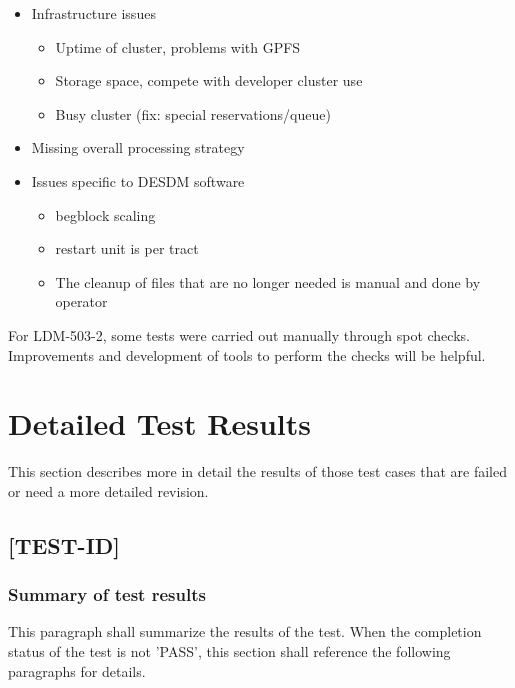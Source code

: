 \documentclass[DM,lsstdraft,STR,toc]{lsstdoc}
\begin{document}
\begin{itemize}
\begin{itemize}
  \end{itemize}
  \item Infrastructure issues
  \begin{itemize}
    \item Uptime of cluster, problems with GPFS
    \item Storage space, compete with developer cluster use
    \item Busy cluster (fix: special reservations/queue)
  \end{itemize}
  \item Missing overall processing strategy
  \item Issues specific to DESDM software
  \begin{itemize}
    \item begblock scaling
    \item restart unit is per tract
    \item The cleanup of files that are no longer needed is manual and done by operator
  \end{itemize}
\end{itemize}

For LDM-503-2, some tests were carried out manually through spot checks.
Improvements and development of tools to perform the checks will be helpful.


\newpage

\section{Detailed Test Results \label{sect:detailed}}
This section describes more in detail the results of those test cases that are failed or need a more detailed revision.
\subsection{[TEST-ID]}
\subsubsection{Summary of test results}
This paragraph shall summarize the results of the test. When the completion status of the test is not 'PASS', this section
shall reference the following paragraphs for details.
\end{document}
